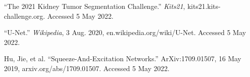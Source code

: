 \documentclass [12pt, letterpaper] {article}
\begin{document}
\begin{thebibliography}{2}
“The 2021 Kidney Tumor Segmentation Challenge.” \emph{Kits21}, kits21.kits-challenge.org. Accessed 5 May 2022.

“U-Net.” \emph{Wikipedia}, 3 Aug. 2020, en.wikipedia.org/wiki/U-Net. Accessed 5 May 2022.

Hu, Jie, et al. “Squeeze-And-Excitation Networks.” ArXiv:1709.01507, 16 May 2019, arxiv.org/abs/1709.01507. Accessed 5 May 2022.
\end{thebibliography}
\end{document}
